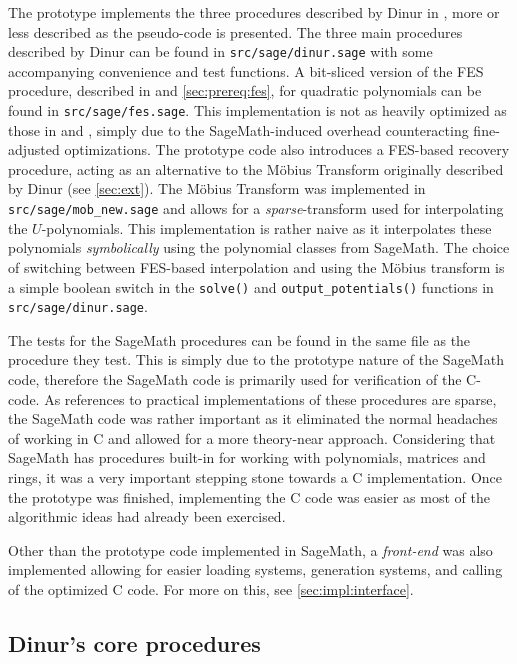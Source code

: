 The prototype implements the three procedures described by Dinur in \cite{eurocrypt-2021-30841}, more or less described as the pseudo-code is presented. The three main procedures described by Dinur can be found in \texttt{src/sage/dinur.sage} with some accompanying convenience and test functions. A bit-sliced version of the FES procedure, described in \cite{ches-2010-23990} and \cref{sec:prereq:fes}, for quadratic polynomials can be found in \texttt{src/sage/fes.sage}. This implementation is not as heavily optimized as those in \cite{ches-2010-23990} and \cite{cryptoeprint:2013/436}, simply due to the SageMath-induced overhead counteracting fine-adjusted optimizations. The prototype code also introduces a FES-based recovery procedure, acting as an alternative to the Möbius Transform originally described by Dinur (see \cref{sec:ext}). The Möbius Transform was implemented in \texttt{src/sage/mob\_new.sage} and allows for a \textit{sparse}-transform used for interpolating the $U$-polynomials. This implementation is rather naive as it interpolates these polynomials \textit{symbolically} using the polynomial classes from SageMath. The choice of switching between FES-based interpolation and using the Möbius transform is a simple boolean switch in the \texttt{solve()} and \texttt{output\_potentials()} functions in \texttt{src/sage/dinur.sage}.

The tests for the SageMath procedures can be found in the same file as the procedure they test. This is simply due to the prototype nature of the SageMath code, therefore the SageMath code is primarily used for verification of the C-code. As references to practical implementations of these procedures are sparse, the SageMath code was rather important as it eliminated the normal headaches of working in C and allowed for a more theory-near approach. Considering that SageMath has procedures built-in for working with polynomials, matrices and rings, it was a very important stepping stone towards a C implementation. Once the prototype was finished, implementing the C code was easier as most of the algorithmic ideas had already been exercised.

Other than the prototype code implemented in SageMath, a \textit{front-end} was also implemented allowing for easier loading systems, generation systems, and calling of the optimized C code. For more on this, see \cref{sec:impl:interface}.

\subsection{Dinur's core procedures}
